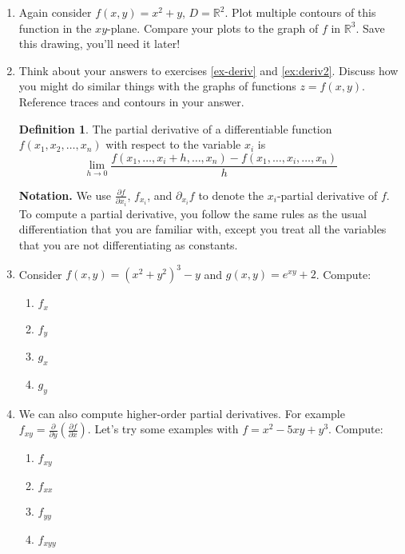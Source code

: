 \documentclass[12pt]{amsart}
\newcommand{\R}{\mathbb{R}}
\theoremstyle{definition}
\newtheorem*{definition}{Definition}
\begin{document}
\begin{enumerate}[itemsep=2.5em,leftmargin=0pt]
\item\label{ex-contours} Again consider $f(x,y)=x^2+y$, $D=\R^2$. Plot multiple contours of this function in the $xy$-plane. Compare your plots to the graph of $f$ in $\R^3$. Save this drawing, you'll need it later!


\item Think about your answers to exercises \ref{ex-deriv} and \ref{ex:deriv2}. Discuss how you might do similar things with the graphs of functions $z=f(x,y)$. Reference traces and contours in your answer.

\vspace{2.5em}

\begin{definition}
    The partial derivative of a differentiable function $f(x_1,x_2,\ldots,x_n)$ with respect to the variable $x_i$ is
    \[
        \lim_{h\to 0} \frac{f(x_1,\ldots,x_i+h,\ldots,x_n) - f(x_1,\ldots,x_i,\ldots,x_n)}{h}
    \]
\end{definition}

\noindent \textbf{Notation.} We use $\frac{\partial f}{\partial x_i}$, $f_{x_i}$, and $\partial_{x_i} f$ to denote the $x_i$-partial derivative of $f$. \\ 

\noindent To compute a partial derivative, you follow the same rules as the usual differentiation that you are familiar with, except you treat all the variables that you are not differentiating as constants.

\vspace{-2em}

\item Consider $f(x,y) = (x^2+y^2)^3 - y$ and $g(x,y)=e^{xy}+2$. Compute:
\begin{enumerate}
    \item $f_x$
    \item $f_y$
    \item $g_x$
    \item $g_y$
\end{enumerate}

\item We can also compute higher-order partial derivatives. For example $f_{xy}=\frac{\partial}{\partial y}\left( \frac{\partial f}{\partial x} \right)$. Let's try some examples with $f=x^2-5xy+y^3$. Compute:
\begin{enumerate}
    \item $f_{xy}$
    \item $f_{xx}$
    \item $f_{yy}$
    \item $f_{xyy}$
\end{enumerate}


\end{enumerate}
\end{document}
